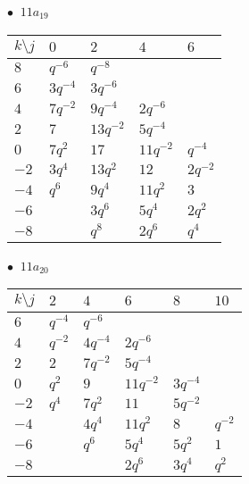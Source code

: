 \begin{minipage}{\linewidth}
$\bullet\ $ $11a_{19}$ \vspace{0.5em} \\
\begin{tabular}{l|llll}
$k \setminus j$ & $0$ & $2$ & $4$ & $6$ \\
\hline
$8$ & $q^{-6}$ & $q^{-8}$ &  &  \\
$6$ & $3q^{-4}$ & $3q^{-6}$ &  &  \\
$4$ & $7q^{-2}$ & $9q^{-4}$ & $2q^{-6}$ &  \\
$2$ & $7$ & $13q^{-2}$ & $5q^{-4}$ &  \\
$0$ & $7q^{2}$ & $17$ & $11q^{-2}$ & $q^{-4}$ \\
$-2$ & $3q^{4}$ & $13q^{2}$ & $12$ & $2q^{-2}$ \\
$-4$ & $q^{6}$ & $9q^{4}$ & $11q^{2}$ & $3$ \\
$-6$ &  & $3q^{6}$ & $5q^{4}$ & $2q^{2}$ \\
$-8$ &  & $q^{8}$ & $2q^{6}$ & $q^{4}$ \\
\end{tabular}
\vspace{2em}
\end{minipage}
%
\begin{minipage}{\linewidth}
$\bullet\ $ $11a_{20}$ \vspace{0.5em} \\
\begin{tabular}{l|lllll}
$k \setminus j$ & $2$ & $4$ & $6$ & $8$ & $10$ \\
\hline
$6$ & $q^{-4}$ & $q^{-6}$ &  &  &  \\
$4$ & $q^{-2}$ & $4q^{-4}$ & $2q^{-6}$ &  &  \\
$2$ & $2$ & $7q^{-2}$ & $5q^{-4}$ &  &  \\
$0$ & $q^{2}$ & $9$ & $11q^{-2}$ & $3q^{-4}$ &  \\
$-2$ & $q^{4}$ & $7q^{2}$ & $11$ & $5q^{-2}$ &  \\
$-4$ &  & $4q^{4}$ & $11q^{2}$ & $8$ & $q^{-2}$ \\
$-6$ &  & $q^{6}$ & $5q^{4}$ & $5q^{2}$ & $1$ \\
$-8$ &  &  & $2q^{6}$ & $3q^{4}$ & $q^{2}$ \\
\end{tabular}
\vspace{2em}
\end{minipage}
%
